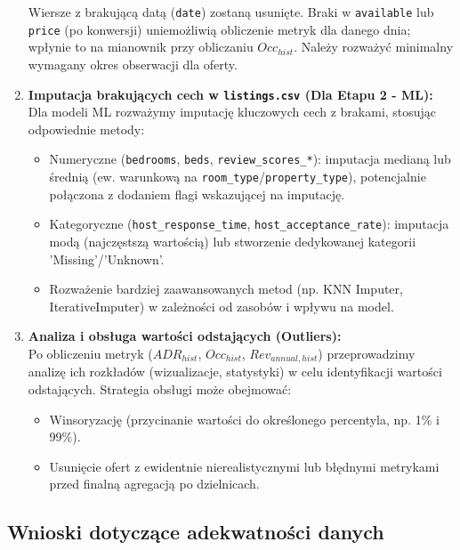 \documentclass[a4paper,11pt]{article}
\begin{document}
\begin{tcolorbox}[enhanced,breakable,colback=blue!5!white,colframe=blue!40!black,title=Proponowane działania naprawcze]
\begin{enumerate}[label=\textbf{Działanie \arabic*.},leftmargin=2cm,itemsep=5pt]
    Wiersze z brakującą datą (\texttt{date}) zostaną usunięte. Braki w \texttt{available} lub \texttt{price} (po konwersji) uniemożliwią obliczenie metryk dla danego dnia; wpłynie to na mianownik przy obliczaniu $Occ_{hist}$. Należy rozważyć minimalny wymagany okres obserwacji dla oferty.
  \item \textbf{Imputacja brakujących cech w \texttt{listings.csv} (Dla Etapu 2 - ML):}\\
    Dla modeli ML rozważymy imputację kluczowych cech z brakami, stosując odpowiednie metody:
    \begin{itemize}
      \item Numeryczne (\texttt{bedrooms}, \texttt{beds}, \texttt{review\_scores\_*}): imputacja medianą lub średnią (ew. warunkową na \texttt{room\_type}/\texttt{property\_type}), potencjalnie połączona z dodaniem flagi wskazującej na imputację.
      \item Kategoryczne (\texttt{host\_response\_time}, \texttt{host\_acceptance\_rate}): imputacja modą (najczęstszą wartością) lub stworzenie dedykowanej kategorii 'Missing'/'Unknown'.
      \item Rozważenie bardziej zaawansowanych metod (np. KNN Imputer, IterativeImputer) w zależności od zasobów i wpływu na model.
    \end{itemize}
  \item \textbf{Analiza i obsługa wartości odstających (Outliers):}\\
    Po obliczeniu metryk ($ADR_{hist}$, $Occ_{hist}$, $Rev_{annual, hist}$) przeprowadzimy analizę ich rozkładów (wizualizacje, statystyki) w celu identyfikacji wartości odstających. Strategia obsługi może obejmować:
    \begin{itemize}
      \item Winsoryzację (przycinanie wartości do określonego percentyla, np. 1\% i 99\%).
      \item Usunięcie ofert z ewidentnie nierealistycznymi lub błędnymi metrykami przed finalną agregacją po dzielnicach.
    \end{itemize}
\end{enumerate}
\end{tcolorbox}

\subsection{Wnioski dotyczące adekwatności danych}
\end{document}
